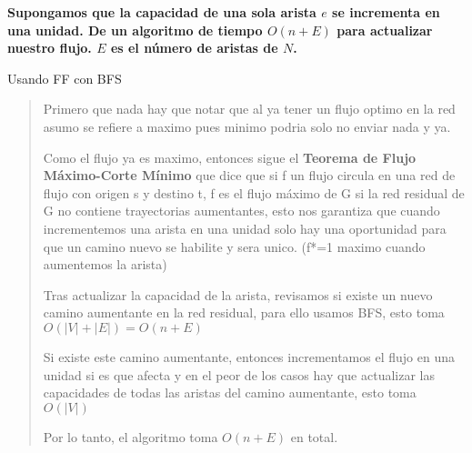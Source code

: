 \textbf{
    Supongamos que la capacidad de una sola arista $e$ se incrementa en una unidad. De un 
    algoritmo de tiempo $O(n+E)$ para actualizar nuestro flujo. $E$ es el número de aristas 
    de $N$.
}\vspace{.2cm}

\textcolor{bibi}{Usando FF con BFS}
\begin{quote}
    Primero que nada hay que notar que al ya tener un flujo optimo en la red asumo se refiere a maximo pues minimo podria solo no enviar nada y ya. \vspace{.2cm} 

    Como el flujo ya es maximo, entonces sigue el \textbf{Teorema de Flujo Máximo-Corte Mínimo} que dice que si f un flujo circula en una red de flujo con origen s y destino t, f es el flujo máximo de G si la red residual de G no contiene trayectorias aumentantes, esto nos garantiza que cuando incrementemos una arista en una unidad solo hay una oportunidad para que un camino nuevo se habilite y sera unico. (f*=1 maximo cuando aumentemos la arista) \vspace{.2cm}

    Tras actualizar la capacidad de la arista, revisamos si existe un nuevo camino aumentante en la red residual, para ello usamos BFS, esto toma $O(|V|+|E|)=O(n+E)$ \vspace{.2cm}

    Si existe este camino aumentante, entonces incrementamos el flujo en una unidad si es que afecta y en el peor de los casos hay que actualizar las capacidades de todas las aristas del camino aumentante, esto toma $O(|V|)$ \vspace{.2cm}

    Por lo tanto, el algoritmo toma $O(n+E)$ en total. \vspace{.2cm}
\end{quote}